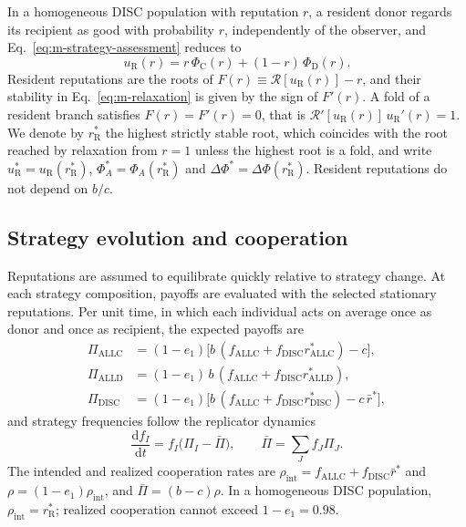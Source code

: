 In a homogeneous DISC population with reputation $r$, a resident donor regards
its recipient as good with probability $r$, independently of the observer, and
Eq.~\eqref{eq:m-strategy-assessment} reduces to
\begin{equation}
u_{\mathrm R}(r)=r\,\Phi_{\mathrm C}(r)+(1-r)\,\Phi_{\mathrm D}(r).
\label{eq:m-resident-assessment}
\end{equation}
Resident reputations are the roots of
$F(r)\equiv\mathcal R[u_{\mathrm R}(r)]-r$, and their stability in
Eq.~\eqref{eq:m-relaxation} is given by the sign of $F'(r)$. A fold of a
resident branch satisfies $F(r)=F'(r)=0$, that is
$\mathcal R'[u_{\mathrm R}(r)]\,u_{\mathrm R}'(r)=1$. We denote by $r_{\mathrm R}^*$
the highest strictly stable root, which coincides with the root reached by
relaxation from $r=1$ unless the highest root is a fold, and write
$u_{\mathrm R}^*=u_{\mathrm R}(r_{\mathrm R}^*)$,
$\Phi_A^*=\Phi_A(r_{\mathrm R}^*)$ and
$\Delta\Phi^*=\Delta\Phi(r_{\mathrm R}^*)$. Resident reputations do not depend
on $b/c$.

\subsection*{Strategy evolution and cooperation}

Reputations are assumed to equilibrate quickly relative to strategy change. At
each strategy composition, payoffs are evaluated with the selected stationary
reputations. Per unit time, in which each individual acts on average once as
donor and once as recipient, the expected payoffs are
\begin{equation}
\begin{aligned}
\Pi_{\mathrm{ALLC}}&=(1-e_1)\bigl[b\,(f_{\mathrm{ALLC}}+f_{\mathrm{DISC}}r^*_{\mathrm{ALLC}})-c\bigr],\\
\Pi_{\mathrm{ALLD}}&=(1-e_1)\,b\,(f_{\mathrm{ALLC}}+f_{\mathrm{DISC}}r^*_{\mathrm{ALLD}}),\\
\Pi_{\mathrm{DISC}}&=(1-e_1)\bigl[b\,(f_{\mathrm{ALLC}}+f_{\mathrm{DISC}}r^*_{\mathrm{DISC}})-c\,\bar r^*\bigr],
\end{aligned}
\label{eq:m-payoffs}
\end{equation}
and strategy frequencies follow the replicator dynamics~\cite{hofbauer1998}
\begin{equation}
\frac{\mathrm d f_I}{\mathrm dt}=f_I\bigl(\Pi_I-\bar\Pi\bigr),\qquad
\bar\Pi=\sum_J f_J\Pi_J .
\label{eq:m-replicator}
\end{equation}
The intended and realized cooperation rates are
$\rho_{\mathrm{int}}=f_{\mathrm{ALLC}}+f_{\mathrm{DISC}}\bar r^*$ and
$\rho=(1-e_1)\rho_{\mathrm{int}}$, and $\bar\Pi=(b-c)\rho$. In a homogeneous DISC
population, $\rho_{\mathrm{int}}=r^*_{\mathrm R}$; realized cooperation
cannot exceed $1-e_1=0.98$.

